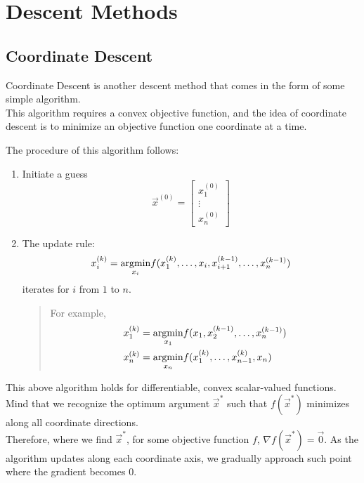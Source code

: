 \chapter{Descent Methods}

\section{Coordinate Descent}
Coordinate Descent is another descent method that comes in the form of some simple algorithm. \\
This algorithm requires a convex objective function, and the idea of coordinate descent is to minimize an objective function one coordinate at a time.

The procedure of this algorithm follows:
\begin{enumerate}
    \item {
        Initiate a guess \[\vec{x}^{(0)} = \begin{bmatrix} x_1^{(0)} \\ \vdots \\ x_n^{(0)} \end{bmatrix}\]
    }
    \item {
        The update rule: \[
            x_i^{(k)} = \underset{x_i}{\rm argmin} f(x_1^{(k)}, \dots, x_i, x_{i + 1}^{(k - 1)}, \dots, x_n^{(k - 1)})
        \]
        iterates for $i$ from $1$ to $n$. \\
        \begin{quote}
            For example,
            \begin{align*}
                x_1^{(k)} &= \underset{x_1}{\rm argmin} f(x_1, x_{2}^{(k - 1)}, \dots, x_n^{(k - 1)}) \\
                x_n^{(k)} &= \underset{x_n}{\rm argmin} f(x_1^{(k)}, \dots, x_{n - 1}^{(k)}, x_n)
            \end{align*}
        \end{quote}
    }
\end{enumerate}
This above algorithm holds for differentiable, convex scalar-valued functions. \\
Mind that we recognize the optimum argument $\vec{x}^*$ such that $f(\vec{x}^*)$ minimizes along all coordinate directions. \\
Therefore, where we find $\vec{x}^*$, for some objective function $f$, $\nabla f (\vec{x}^*) = \vec{0}$.
As the algorithm updates along each coordinate axis, we gradually approach such point where the gradient becomes $0$.

